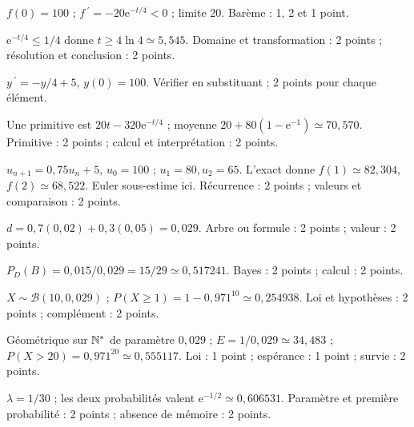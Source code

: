\par\addvspace{6mm}\label{evaluation-cor-1}
\begin{questions}
\item $f(0)=100$ ; $f\,\!^{\prime}=-20\mathrm e^{-t/4}<0$ ; limite $20$. Barème : 1, 2 et 1 point.
\item $\mathrm e^{-t/4}\leq1/4$ donne $t\geq4\ln4\simeq5{,}545$. Domaine et transformation : 2 points ; résolution et conclusion : 2 points.
\item $y\,\!^{\prime}=-y/4+5$, $y(0)=100$. Vérifier en substituant ; 2 points pour chaque élément.
\item Une primitive est $20t-320\mathrm e^{-t/4}$ ; moyenne $20+80(1-\mathrm e^{-1})\simeq70{,}570$. Primitive : 2 points ; calcul et interprétation : 2 points.
\item $u_{n+1}=0{,}75u_n+5$, $u_0=100$ ; $u_1=80,u_2=65$. L’exact donne $f(1)\simeq82{,}304$, $f(2)\simeq68{,}522$. Euler sous-estime ici. Récurrence : 2 points ; valeurs et comparaison : 2 points.
\end{questions}
\par\addvspace{6mm}\label{evaluation-cor-2}
\begin{questions}
\item $d=0{,}7(0{,}02)+0{,}3(0{,}05)=0{,}029$. Arbre ou formule : 2 points ; valeur : 2 points.
\item $P_D(B)=0{,}015/0{,}029=15/29\simeq0{,}517241$. Bayes : 2 points ; calcul : 2 points.
\item $X\sim\mathcal B(10,0{,}029)$ ; $P(X\geq1)=1-0{,}971^{10}\simeq0{,}254938$. Loi et hypothèses : 2 points ; complément : 2 points.
\item Géométrique sur $\mathbb{N}^*$ de paramètre $0{,}029$ ; $E=1/0{,}029\simeq34{,}483$ ; $P(X>20)=0{,}971^{20}\simeq0{,}555117$. Loi : 1 point ; espérance : 1 point ; survie : 2 points.
\item $\lambda=1/30$ ; les deux probabilités valent $\mathrm e^{-1/2}\simeq0{,}606531$. Paramètre et première probabilité : 2 points ; absence de mémoire : 2 points.
\end{questions}
\par\addvspace{6mm}\label{evaluation-cor-3}
